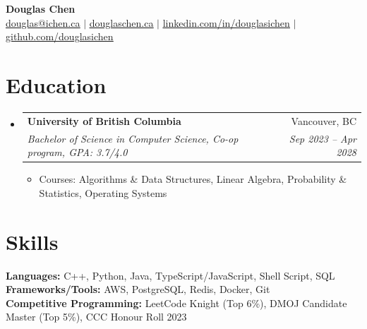 \documentclass[letterpaper,11pt]{article}
\makeatletter
\newcommand{\resumeItem}[1]{
  \item\small{
    {#1 \vspace{-0.6pt}}
  }
}
\newcommand{\resumeSubheading}[4]{
  \vspace{0pt}\item
    \begin{tabular*}{0.97\textwidth}[t]{l@{\extracolsep{\fill}}r}
      \textbf{#1} & #2 \\
      \textit{\small#3} & \textit{\small #4} \\
    \end{tabular*}\vspace{-7pt}
}
\newcommand{\resumeSubHeadingListStart}{\begin{itemize}[leftmargin=0.15in, label={}]}
\newcommand{\resumeSubHeadingListEnd}{\end{itemize}}
\newcommand{\resumeItemListStart}{\begin{itemize}}
\newcommand{\resumeItemListEnd}{\end{itemize}\vspace{-7pt}}
\makeatother
\begin{document}
\begin{center}
    \textbf{\Huge Douglas Chen} \\ \vspace{1pt}
    \href{mailto:douglas@ichen.ca}{\underline{douglas@ichen.ca}} $|$
    \href{https://www.douglaschen.ca/}{\underline{douglaschen.ca}} $|$
    \href{https://www.linkedin.com/in/douglasichen/}{\underline{linkedin.com/in/douglasichen}} $|$
    \href{https://www.github.com/douglasichen}{\underline{github.com/douglasichen}}
\end{center}

\section{Education}
  \resumeSubHeadingListStart
    \resumeSubheading
      {University of British Columbia}{Vancouver, BC}
      {Bachelor of Science in Computer Science, Co-op program, GPA: 3.7/4.0}{Sep 2023 -- Apr 2028}
      \resumeItemListStart
        \resumeItem{Courses: Algorithms \& Data Structures, Linear Algebra, Probability \& Statistics, Operating Systems}
      \resumeItemListEnd
  \resumeSubHeadingListEnd

\section{Skills}
 \begin{itemize}[leftmargin=0.15in, label={}]
    \small{\item{
         \textbf{Languages:}{ C++, Python, Java, TypeScript/JavaScript, Shell Script, SQL} \\
     \textbf{Frameworks/Tools:}{ AWS, PostgreSQL, Redis, Docker, Git} \\
     \textbf{Competitive Programming:}{ LeetCode Knight (Top 6\%), DMOJ Candidate Master (Top 5\%), CCC Honour Roll 2023}
    }}
 \end{itemize}
\end{document}
